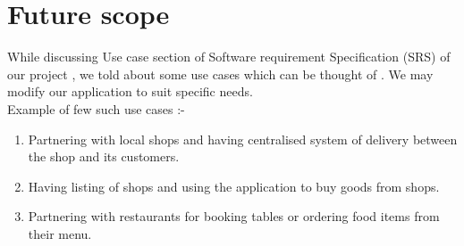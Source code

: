 \documentclass{report}
\begin{document}
\chapter{Future scope}
While discussing Use case section of Software requirement Specification (SRS) of our project , we told about some use cases which can be thought of .
We may modify our application to suit specific needs.\\

Example of few such use cases :-
\begin{enumerate}[label=\Roman*]
\item Partnering with local shops and having centralised system of delivery between the shop and its customers. 
\item Having listing of shops and using the application to buy goods from shops.
\item Partnering with restaurants for booking tables or ordering food items from their menu.

\end{enumerate}

\end{document}
